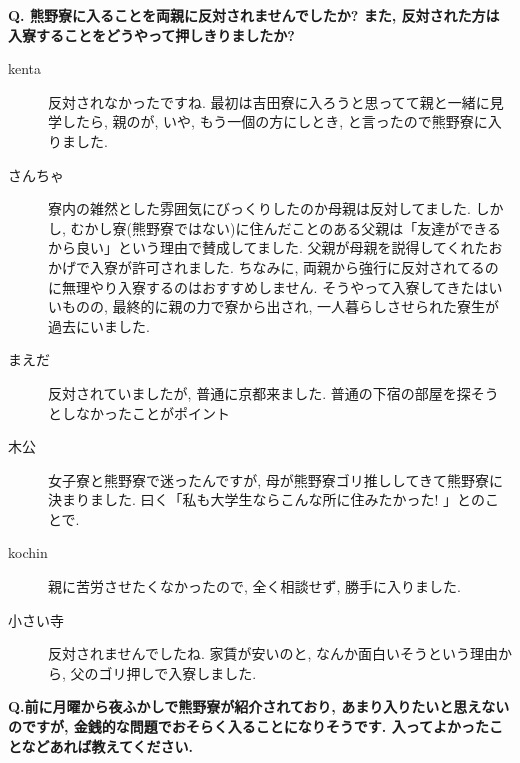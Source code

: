 \documentclass[10pt,b5jsbook,dvips,dvipdfmx,openany]{jsbook}
\theoremstyle{definition}
\begin{document}
		\begin{tcolorbox}
		\textbf{Q. 熊野寮に入ることを両親に反対されませんでしたか? また, 反対された方は入寮することをどうやって押しきりましたか?}
		\end{tcolorbox}
		\begin{description}
		\item[kenta]反対されなかったですね. 最初は吉田寮に入ろうと思ってて親と一緒に見学したら, 親のが, いや, もう一個の方にしとき, と言ったので熊野寮に入りました.

		\item[さんちゃ]
		寮内の雑然とした雰囲気にびっくりしたのか母親は反対してました. しかし, むかし寮(熊野寮ではない)に住んだことのある父親は「友達ができるから良い」という理由で賛成してました. 父親が母親を説得してくれたおかげで入寮が許可されました. ちなみに, 両親から強行に反対されてるのに無理やり入寮するのはおすすめしません. そうやって入寮してきたはいいものの, 最終的に親の力で寮から出され, 一人暮らしさせられた寮生が過去にいました.

		\item[まえだ]
		反対されていましたが, 普通に京都来ました. 普通の下宿の部屋を探そうとしなかったことがポイント

		\item[木公]
		女子寮と熊野寮で迷ったんですが, 母が熊野寮ゴリ推ししてきて熊野寮に決まりました. 曰く「私も大学生ならこんな所に住みたかった! 」とのことで.

		\item[kochin]
		親に苦労させたくなかったので, 全く相談せず, 勝手に入りました.

		\item[小さい寺]
		反対されませんでしたね. 家賃が安いのと, なんか面白いそうという理由から, 父のゴリ押しで入寮しました.
		\end{description}

		\begin{tcolorbox}
		\textbf{Q.前に月曜から夜ふかしで熊野寮が紹介されており, あまり入りたいと思えないのですが, 金銭的な問題でおそらく入ることになりそうです. 入ってよかったことなどあれば教えてください. }
		\end{tcolorbox}
\end{document}
